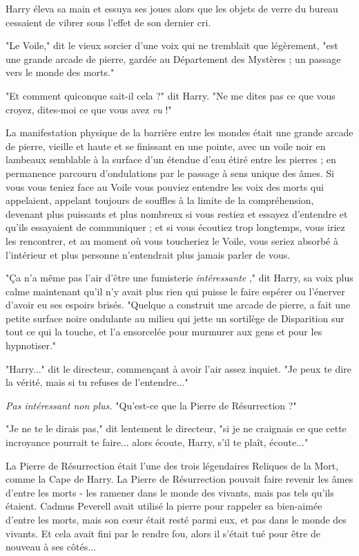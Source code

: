 Harry éleva sa main et essuya ses joues alors que les objets de verre du bureau cessaient de vibrer sous l'effet de son dernier cri.

"Le Voile," dit le vieux sorcier d'une voix qui ne tremblait que légèrement, "est une grande arcade de pierre, gardée au Département des Mystères ; un passage vers le monde des morts."

"Et comment quiconque sait-il cela ?" dit Harry. "Ne me dites pas ce que vous croyez, dites-moi ce que vous avez \emph{vu}  !"

La manifestation physique de la barrière entre les mondes était une grande arcade de pierre, vieille et haute et se finissant en une pointe, avec un voile noir en lambeaux semblable à la surface d'un étendue d'eau étiré entre les pierres ; en permanence parcouru d'ondulations par le passage à sens unique des âmes. Si vous vous teniez face au Voile vous pouviez entendre les voix des morts qui appelaient, appelant toujours de souffles à la limite de la compréhension, devenant plus puissants et plus nombreux si vous restiez et essayez d'entendre et qu'ils essayaient de communiquer ; et si vous écoutiez trop longtemps, vous iriez les rencontrer, et au moment où vous toucheriez le Voile, vous seriez absorbé à l'intérieur et plus personne n'entendrait plus jamais parler de vous.

"Ça n'a même pas l'air d'être une fumisterie \emph{intéressante} ," dit Harry, sa voix plus calme maintenant qu'il n'y avait plus rien qui puisse le faire espérer ou l'énerver d'avoir eu ses espoirs brisés. "Quelque a construit une arcade de pierre, a fait une petite surface noire ondulante au milieu qui jette un sortilège de Disparition sur tout ce qui la touche, et l'a ensorcelée pour murmurer aux gens et pour les hypnotiser."

"Harry..." dit le directeur, commençant à avoir l'air assez inquiet. "Je peux te dire la vérité, mais si tu refuses de l'entendre..."

\emph{Pas intéressant non plus.}  "Qu'est-ce que la Pierre de Résurrection ?"

"Je ne te le dirais pas," dit lentement le directeur, "si je ne craignais ce que cette incroyance pourrait te faire... alors écoute, Harry, s'il te plaît, écoute..."

La Pierre de Résurrection était l'une des trois légendaires Reliques de la Mort, comme la Cape de Harry. La Pierre de Résurrection pouvait faire revenir les âmes d'entre les morts - les ramener dans le monde des vivants, mais pas tels qu'ils étaient. Cadmus Peverell avait utilisé la pierre pour rappeler sa bien-aimée d'entre les morts, mais son cœur était resté parmi eux, et pas dans le monde des vivants. Et cela avait fini par le rendre fou, alors il s'était tué pour être de nouveau à ses côtés...

